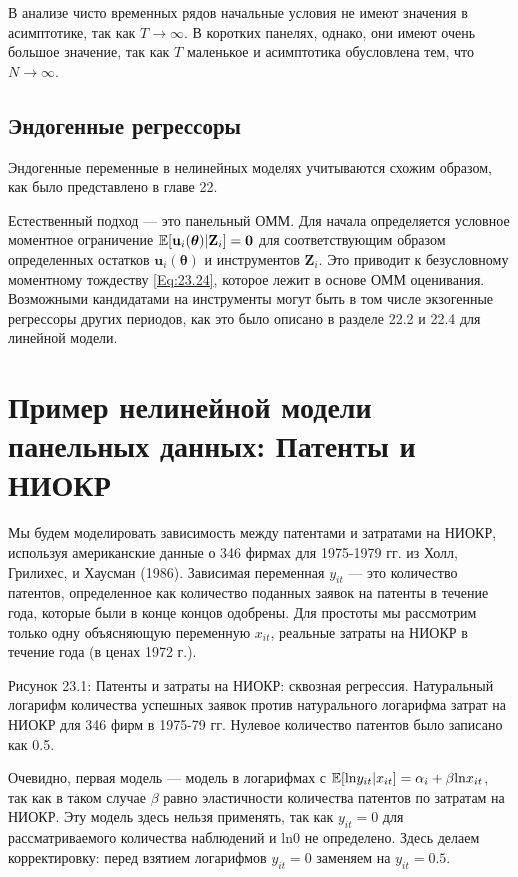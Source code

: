 В анализе чисто временных рядов начальные условия не имеют значения в асимптотике, так как $T \rightarrow \infty$. В коротких панелях, однако, они имеют очень большое значение, так как $T$ маленькое и асимптотика обусловлена тем, что $N \rightarrow \infty$. 

\subsection{Эндогенные регрессоры}

Эндогенные переменные  в нелинейных моделях учитываются схожим образом, как было представлено в главе 22.

Естественный подход --- это панельный ОММ. Для начала определяется условное моментное ограничение $\mathbb{E}[\mathbf{u}_i(\bm\theta)|\mathbf{Z}_i]=\mathbf{0}$ для соответствующим образом определенных остатков $\mathbf{u}_i(\bm\theta)$ и инструментов $\mathbf{Z}_i$. Это приводит к безусловному моментному тождеству \ref{Eq:23.24}, которое лежит в основе ОММ оценивания. Возможными кандидатами на инструменты могут быть в том числе экзогенные регрессоры других периодов, как это было описано в разделе 22.2 и 22.4 для линейной модели.

\section{Пример нелинейной модели панельных данных: Патенты и НИОКР}

Мы будем моделировать зависимость между патентами и затратами на НИОКР, используя американские данные о 346 фирмах для 1975-1979 гг. из Холл, Грилихес, и Хаусман (1986). Зависимая переменная $y_{it}$ --- это количество патентов, определенное как количество поданных заявок на патенты в течение года, которые были в конце концов одобрены. Для простоты мы рассмотрим только одну объясняющую переменную $x_{it}$, реальные затраты на НИОКР в течение года (в ценах 1972 г.).

Рисунок 23.1: Патенты и затраты на НИОКР: сквозная регрессия. Натуральный логарифм количества успешных заявок против натурального логарифма затрат на НИОКР для 346 фирм в 1975-79 гг. Нулевое количество патентов было записано как 0.5.

Очевидно, первая модель --- модель в логарифмах с $\mathbb{E}[\mathrm{ln} y_{it}|x_{it}]=\alpha_i+\beta \mathrm{ln} x_{it}$, так как в таком случае $\beta$ равно эластичности количества патентов по затратам на НИОКР. Эту модель здесь нельзя применять, так как $y_{it}=0$ для рассматриваемого количества наблюдений и $\mathrm{ln 0}$ не определено. Здесь делаем корректировку: перед взятием логарифмов $y_{it}=0$ заменяем на $y_{it}=0.5$.

